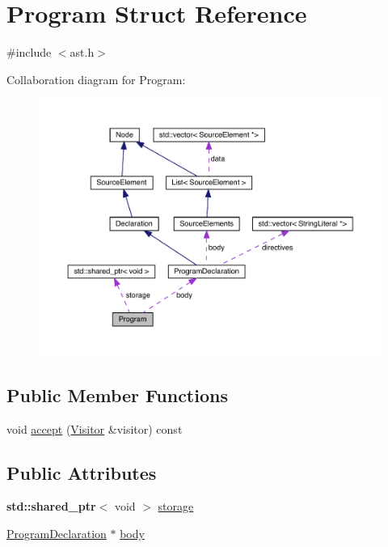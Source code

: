 \hypertarget{struct_program}{}\section{Program Struct Reference}
\label{struct_program}


{\ttfamily \#include $<$ast.\+h$>$}



Collaboration diagram for Program\+:\nopagebreak
\begin{figure}[H]
\begin{center}
\leavevmode
\includegraphics[width=350pt]{struct_program__coll__graph}
\end{center}
\end{figure}
\subsection*{Public Member Functions}
\begin{DoxyCompactItemize}
\item 
void \hyperlink{struct_program_afbd3eb6a94760e56c25492ea1dc685ed}{accept} (\hyperlink{struct_visitor}{Visitor} \&visitor) const
\end{DoxyCompactItemize}
\subsection*{Public Attributes}
\begin{DoxyCompactItemize}
\item 
\textbf{ std\+::shared\+\_\+ptr}$<$ void $>$ \hyperlink{struct_program_aa25d5746067ab06823bf867e89dc8785}{storage}
\item 
\hyperlink{struct_program_declaration}{Program\+Declaration} $\ast$ \hyperlink{struct_program_aac5fe6649a517713e596e4ad5f45e4a4}{body}
\end{DoxyCompactItemize}


